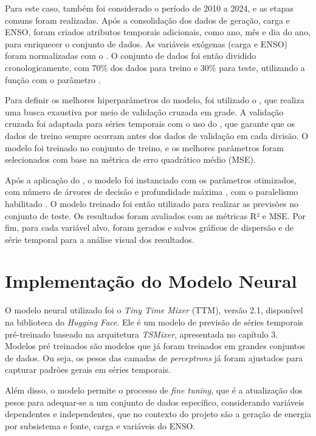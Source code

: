 Para este caso, também foi considerado o período de 2010 a 2024, e as etapas comuns foram realizadas. Após a consolidação 
dos dados de geração, carga e ENSO, foram criados atributos temporais adicionais, como ano, mês e dia do ano, para enriquecer 
o conjunto de dados. As variáveis exógenas (carga e ENSO) foram normalizadas com o . O conjunto de dados 
foi então dividido cronologicamente, com 70\% dos dados para treino e 30\% para teste, utilizando a função  
com o parâmetro .

Para definir os melhores hiperparâmetros do modelo, foi utilizado o , que realiza uma busca exaustiva por 
meio de validação cruzada em grade. A validação cruzada foi adaptada para séries temporais com o uso do , 
que garante que os dados de treino sempre ocorram antes dos dados de validação em cada divisão. O modelo foi treinado no conjunto 
de treino, e os melhores parâmetros foram selecionados com base na métrica de erro quadrático médio (MSE).

Após a aplicação do , o modelo foi instanciado com os parâmetros otimizados, com número de árvores de decisão 
 e profundidade máxima , com o paralelismo habilitado . O modelo 
treinado foi então utilizado para realizar as previsões no conjunto de teste. Os resultados foram avaliados com as métricas R² e MSE. 
Por fim, para cada variável alvo, foram gerados e salvos gráficos de dispersão e de série temporal para a análise visual dos resultados.


\section{Implementação do Modelo Neural} %
O modelo neural utilizado foi o \textit{Tiny Time Mixer} (TTM), versão 2.1, disponível na biblioteca  do 
\textit{Hugging Face}. Ele é um modelo de previsão de séries temporais pré-treinado baseado na arquitetura \textit{TSMixer}, 
apresentada no capítulo 3. Modelos pré treinados são modelos que já foram treinados em grandes conjuntos de dados. Ou seja, 
os pesos das camadas de \textit{perceptrons} já foram ajustados para capturar padrões gerais em séries temporais.

Além disso, o modelo permite o processo de \textit{fine tuning}, que é a atualização dos pesos para adequar-se
a um conjunto de dados específico, considerando variáveis dependentes e independentes, que no contexto do projeto são a geração de energia
por subsistema e fonte, carga e variáveis do ENSO.

